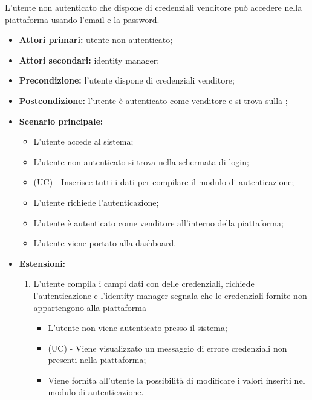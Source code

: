 L'utente non autenticato che dispone di credenziali venditore può accedere nella piattaforma usando l'email e la password.
\begin{itemize}
    \item \textbf{Attori primari:} utente non autenticato;
    \item \textbf{Attori secondari:} identity manager;
    \item \textbf{Precondizione:} l'utente dispone di credenziali venditore;
    \item \textbf{Postcondizione:} l'utente è autenticato come venditore e si trova sulla ;
    \item \textbf{Scenario principale:}
    \begin{itemize}
    	\item L'utente accede al sistema;
    	\item L'utente non autenticato si trova nella schermata di login;
    	\item (UC) - Inserisce tutti i dati per compilare il modulo di autenticazione; %
    	\item L'utente richiede l'autenticazione;
    	\item L'utente è autenticato come venditore all'interno della piattaforma;
    	\item L'utente viene portato alla dashboard.
    \end{itemize}
	\item \textbf{Estensioni:}
	\begin{enumerate}
		\item L'utente compila i campi dati con delle credenziali, richiede l'autenticazione e l'identity manager segnala che le credenziali fornite non appartengono alla piattaforma
		\begin{itemize}
			\item L'utente non viene autenticato presso il sistema;
			\item (UC) - Viene visualizzato un messaggio di errore credenziali non presenti nella piattaforma;
			\item Viene fornita all'utente la possibilità di modificare i valori inseriti nel modulo di autenticazione.
		\end{itemize}
	\end{enumerate} 
\end{itemize}

